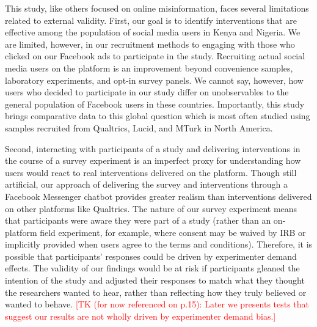 \documentclass[letterpaper, 12pt, parskip=full,DIV=10]{scrartcl}
\begin{document}
This study, like others focused on online misinformation, faces several limitations related to external validity. First, our goal is to identify interventions that are effective among the population of social media users in Kenya and Nigeria. We are limited, however, in our recruitment methods to engaging with those who clicked on our Facebook ads to participate in the study.  Recruiting actual social media users on the platform is an improvement beyond convenience samples, laboratory experiments, and opt-in survey panels.  We cannot say, however, how users who decided to participate in our study differ on unobservables to the general population of Facebook users in these countries. Importantly, this study brings comparative data to this global question which is most often studied using samples recruited from Qualtrics, Lucid, and MTurk in North America.  

Second, interacting with participants of a study and delivering interventions in the course of a survey experiment is an imperfect proxy for understanding how users would react to real interventions delivered on the platform.  Though still artificial, our approach of delivering the survey and interventions through a Facebook Messenger chatbot provides greater realism than interventions delivered on other platforms like Qualtrics.  The nature of our survey experiment means that participants were aware they were part of a study (rather than an on-platform field experiment, for example,  where consent may be waived by IRB or implicitly provided when users agree to the terms and conditions). Therefore, it is possible that participants' responses could be driven by experimenter demand effects. The validity of our findings would be at risk if participants gleaned the intention of the study and adjusted their responses to match what they thought the researchers wanted to hear, rather than reflecting how they truly believed or wanted to behave.  \textcolor{red}{[TK (for now referenced on p.15): Later we presents tests that suggest our results are not wholly driven by experimenter demand bias.]} %
\end{document}
